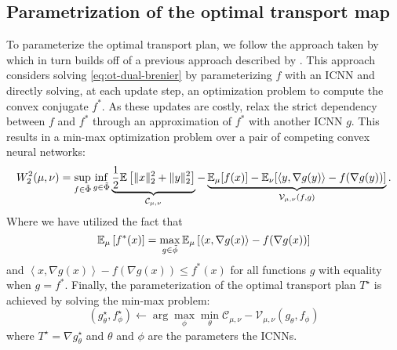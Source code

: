 \subsection{Parametrization of the optimal transport map}
To parameterize the optimal transport plan, we follow the approach taken by \citeauthor{makkuva2020optimal} which 
in turn builds off of a previous approach described by \citet{taghvaei20192}.
This approach considers solving \eqref{eq:ot-dual-brenier} by parameterizing $f$ with an ICNN and directly solving, at each update step, an optimization problem to compute the convex conjugate $f^*$.
As these updates are costly, \citet{makkuva2020optimal} relax the strict dependency between $f$ and $f^*$
through an approximation of $f^*$ with another ICNN $g$.
This results in a min-max optimization problem over a pair of competing convex neural networks:
\begin{equation} \label{eq:ot-makkuva}
  W_{2}^2(\mu, \nu)=\sup _{\substack{f \in \Tilde{\Phi}}} \inf _{g \in \Tilde{\Phi}}  \underbrace{\frac{1}{2}\mathbb{E}\left[\|x\|_{2}^{2}+\|y\|_{2}^{2}\right]}_{\mathcal{C}_{\mu, \nu}} - \underbrace{\mathbb{E}_{\mu}[f(x)]-\mathbb{E}_{\nu}[\langle y, \nabla g(y)\rangle-f(\nabla g(y))]}_{\mathcal{V}_{\mu, \nu}(f, g)}.
\end{equation}
Where we have utilized the fact that
\begin{equation}
  \mathbb{E}_\mu \left[f^*(x)\right] = \max_{g \in \Tilde{\phi}} \mathbb{E}_\mu \left[ \left<x, \nabla g(x)\right> - f(\nabla g(x))\right]
  \label{eq:ot-makkuva-hint}
\end{equation}
and 
$\left<x, \nabla g(x)\right> - f(\nabla g(x)) \leq f^*(x)$ for all functions $g$ with equality when $g=f^*$.
Finally, the parameterization of the optimal transport plan $T^\star$ is achieved by solving the min-max problem:
\begin{equation}
  (g^\star_\theta, f^\star_\phi) \leftarrow \arg \max_\phi \min_\theta \mathcal{C}_{\mu,\nu} - \mathcal{V}_{\mu, \nu}(g_\theta, f_\phi)
  \label{eq:ot-makkuva-optim}
\end{equation}
where $T^\star = \nabla g^\star_\theta$ and $\theta$ and $\phi$ are the parameters the ICNNs.



